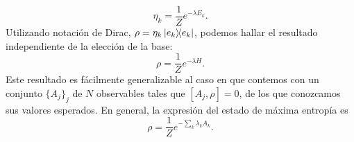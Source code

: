 \begin{equation}
    \eta_{k}=\frac{1}{Z}e^{-\lambda E_{k}}.\nonumber
\end{equation}
Utilizando notación de Dirac, $\rho=\eta_{k}\dyad{e_{k}}$, podemos hallar el resultado independiente de la elección de la base:
\begin{equation}
    \rho=\frac{1}{Z}e^{-\lambda H}.
\end{equation}
Este resultado es fácilmente generalizable al caso en que contemos con un  conjunto $\{A_{j}\}_{j}$ de $N$ observables tales que $[A_{j},\rho]=0$, de los que conozcamos sus valores esperados. En general, la expresión del estado de máxima entropía es
\begin{equation}\label{eq:GeneralMaxEnt}
    \rho=\frac{1}{Z}e^{-\sum_{k}\lambda_{k} A_{k}}.
\end{equation}
